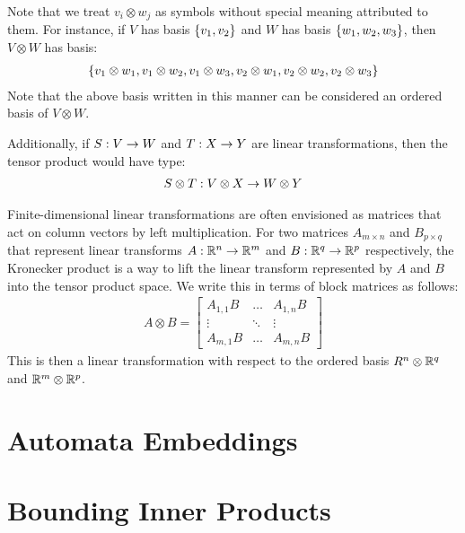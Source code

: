 \documentclass[12pt]{article}
\begin{document}
Note that we treat \(v_i \otimes w_j\)
as symbols without special meaning attributed to them.
For instance, if \(V\) has basis \(\left\{v_1, v_2\right\}\)
and \(W\) has basis \(\left\{w_1, w_2, w_3\right\}\),
then \(V \otimes W\) has basis:
\begin{align*}
  \left\{v_1 \otimes w_1, v_1 \otimes w_2, v_1 \otimes w_3,
          v_2 \otimes w_1, v_2 \otimes w_2, v_2 \otimes w_3\right\}
\end{align*}
Note that the above basis written in this manner can be considered
an ordered basis of \(V \otimes W\).

Additionally, if \(S : V \to W\) and \(T : X \to Y\)
are linear transformations,
then the tensor product would have type:
\begin{align*}
  S \otimes T : V \otimes X \to W \otimes Y
\end{align*}

Finite-dimensional linear transformations are often envisioned
as matrices that act on column vectors by left multiplication.
For two matrices \(A_{m \times n}\) and \(B_{p \times q}\)
that represent linear transforms
\(A : \mathbb{R}^n \to \mathbb{R}^m\) and \(B : \mathbb{R}^q \to \mathbb{R}^p\) respectively,
the Kronecker product is a way to lift the linear
transform represented by \(A\) and \(B\) into the tensor product space.
We write this in terms of block matrices as follows:
\begin{align*}
  {A \otimes B}
    = \begin{bmatrix}
        A_{1, 1} B & \ldots & A_{1, n} B \\
        \vdots & \ddots & \vdots \\
        A_{m, 1} B & \ldots & A_{m, n} B
      \end{bmatrix}
\end{align*}
This is then a linear transformation with respect to the ordered basis
\(R^n \otimes \mathbb{R}^q\) and \(\mathbb{R}^m \otimes \mathbb{R}^p\).



\section{Automata Embeddings}



\section{Bounding Inner Products}



\printbibliography
\end{document}
